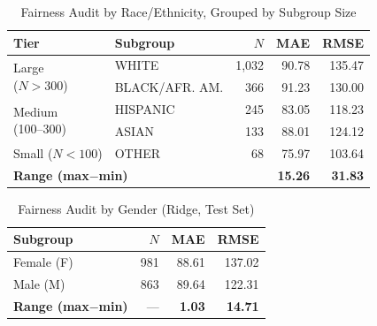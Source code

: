 \documentclass[conference]{IEEEtran}
\begin{document}
\begin{table}[H]
\centering
\caption{Fairness Audit by Race/Ethnicity, Grouped by Subgroup Size}
\label{tab:fair_race}
\renewcommand{\arraystretch}{1.15}
\begin{tabular}{p{1.9cm}lrrr}
\toprule
\textbf{Tier} & \textbf{Subgroup} & \textbf{$N$} & \textbf{MAE} & \textbf{RMSE} \\
\midrule
\multirow{2}{*}{\parbox{1.9cm}{Large\\($N>300$)}}
 & WHITE                  & 1{,}032 & 90.78 & 135.47 \\
 & BLACK/AFR. AM.         &   366 & 91.23 & 130.00 \\
\midrule
\multirow{2}{*}{\parbox{1.9cm}{Medium\\(100--300)}}
 & HISPANIC               &   245 & 83.05 & 118.23 \\
 & ASIAN                  &   133 & 88.01 & 124.12 \\
\midrule
Small ($N<100$)
 & OTHER                  &    68 & 75.97 & 103.64 \\
\midrule
\multicolumn{3}{l}{\textbf{Range (max$-$min)}} & \textbf{15.26} & \textbf{31.83} \\
\bottomrule
\end{tabular}
\end{table}

\begin{table}[H]
\centering
\caption{Fairness Audit by Gender (Ridge, Test Set)}
\label{tab:fair_gender}
\renewcommand{\arraystretch}{1.15}
\begin{tabular}{lrrr}
\toprule
\textbf{Subgroup} & \textbf{$N$} & \textbf{MAE} & \textbf{RMSE} \\
\midrule
Female (F) & 981 & 88.61 & 137.02 \\
Male (M)   & 863 & 89.64 & 122.31 \\
\midrule
\textbf{Range (max$-$min)} & --- & \textbf{1.03} & \textbf{14.71} \\
\bottomrule
\end{tabular}
\end{table}
\end{document}
